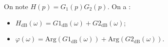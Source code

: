 \documentclass[10pt,fleqn]{article} %
\begin{document}
\begin{prop}
On note $H(p)=G_1(p)G_2(p)$. On a :
\begin{itemize}
\item $H_{\text{dB}}\left( \omega\right) =G1_{\text{dB}}\left( \omega\right)+G2_{\text{dB}}\left( \omega\right)$;
\item $\varphi\left( \omega\right)  =\text{Arg}\left(G1_{\text{dB}}\left( \omega\right)\right)+\text{Arg}\left(G2_{\text{dB}}\left( \omega\right)\right)$.
\end{itemize}
\end{prop}
\end{document}
